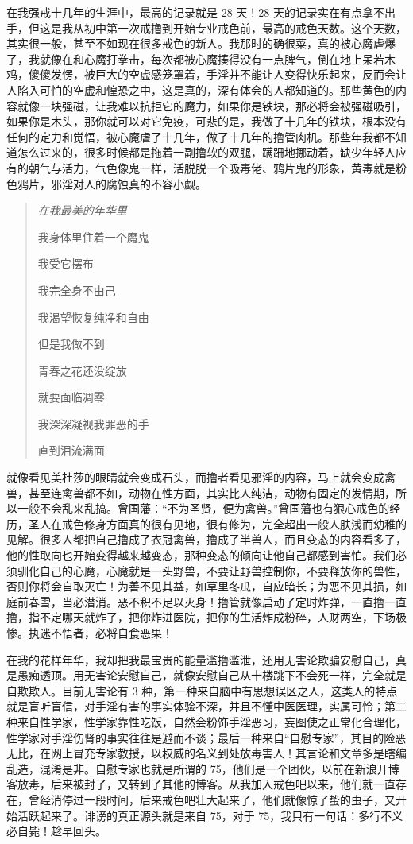 在我强戒十几年的生涯中，最高的记录就是 28 天！28 天的记录实在有点拿不出手，但这是我从初中第一次戒撸到开始专业戒色前，最高的戒色天数。这个天数，其实很一般，甚至不如现在很多戒色的新人。我那时的确很菜，真的被心魔虐爆了，我就像在和心魔打拳击，每次都被心魔揍得没有一点脾气，倒在地上呆若木鸡，傻傻发愣，被巨大的空虚感笼罩着，手淫并不能让人变得快乐起来，反而会让人陷入可怕的空虚和惶恐之中，这是真的，深有体会的人都知道的。那些黄色的内容就像一块强磁，让我难以抗拒它的魔力，如果你是铁块，那必将会被强磁吸引，如果你是木头，那你就可以对它免疫，可悲的是，我做了十几年的铁块，根本没有任何的定力和觉悟，被心魔虐了十几年，做了十几年的撸管肉机。那些年我都不知道怎么过来的，很多时候都是拖着一副撸软的双腿，蹒跚地挪动着，缺少年轻人应有的朝气与活力，气色像鬼一样，活脱脱一个吸毒佬、鸦片鬼的形象，黄毒就是粉色鸦片，邪淫对人的腐蚀真的不容小觑。

\begin{multicols}{2}
    \begin{quotation}\it
        在我最美的年华里

        我身体里住着一个魔鬼

        我受它摆布

        我完全身不由己

        我渴望恢复纯净和自由

        但是我做不到

        青春之花还没绽放

        就要面临凋零

        我深深凝视我罪恶的手

        直到泪流满面
    \end{quotation}
\end{multicols}

就像看见美杜莎的眼睛就会变成石头，而撸者看见邪淫的内容，马上就会变成禽兽，甚至连禽兽都不如，动物在性方面，其实比人纯洁，动物有固定的发情期，所以一般不会乱来乱搞。曾国藩：“不为圣贤，便为禽兽。”曾国藩也有狠心戒色的经历，圣人在戒色修身方面真的很有见地，很有修为，完全超出一般人肤浅而幼稚的见解。很多人都把自己撸成了衣冠禽兽，撸成了半兽人，而且变态的内容看多了，他的性取向也开始变得越来越变态，那种变态的倾向让他自己都感到害怕。我们必须驯化自己的心魔，心魔就是一头野兽，不要让野兽控制你，不要释放你的兽性，否则你将会自取灭亡！为善不见其益，如草里冬瓜，自应暗长；为恶不见其损，如庭前春雪，当必潜消。恶不积不足以灭身！撸管就像启动了定时炸弹，一直撸一直撸，指不定哪天就炸了，把你炸进医院，把你的生活炸成粉碎，人财两空，下场极惨。执迷不悟者，必将自食恶果！

在我的花样年华，我却把我最宝贵的能量滥撸滥泄，还用无害论欺骗安慰自己，真是愚痴透顶。用无害论安慰自己，就像安慰自己从十楼跳下不会死一样，完全就是自欺欺人。目前无害论有 3 种，第一种来自脑中有思想误区之人，这类人的特点就是盲听盲信，对手淫有害的事实体验不深，并且不懂中医医理，实属可怜；第二种来自性学家，性学家靠性吃饭，自然会粉饰手淫恶习，妄图使之正常化合理化，性学家对手淫伤肾的事实往往是避而不谈；最后一种来自“自慰专家”，其目的险恶无比，在网上冒充专家教授，以权威的名义到处放毒害人！其言论和文章多是瞎编乱造，混淆是非。自慰专家也就是所谓的 75，他们是一个团伙，以前在新浪开博客放毒，后来被封了，又转到了其他的博客。从我加入戒色吧以来，他们就一直存在，曾经消停过一段时间，后来戒色吧壮大起来了，他们就像惊了蛰的虫子，又开始活跃起来了。诽谤的真正源头就是来自 75，对于 75，我只有一句话：多行不义必自毙！趁早回头。

